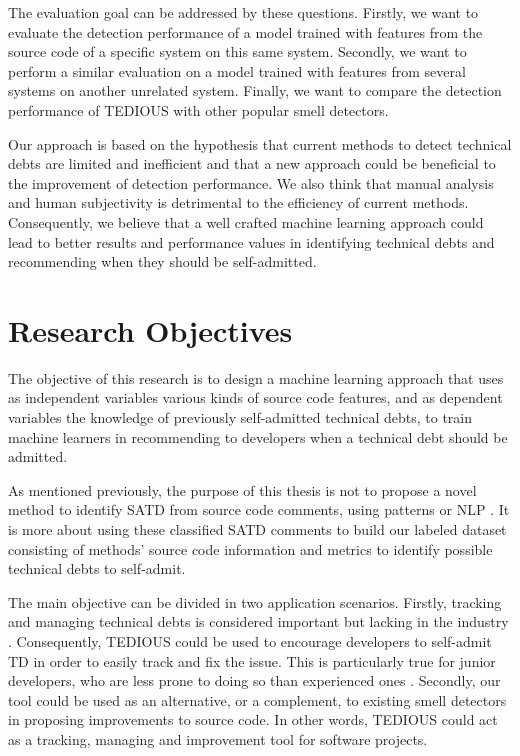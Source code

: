 The evaluation goal can be addressed by these questions. Firstly, we want to evaluate the detection performance of a model trained with features from the source code of a specific system on this same system. Secondly, we want to perform a similar evaluation on a model trained with features from several systems on another unrelated system. Finally, we want to compare the detection performance of TEDIOUS with other popular smell detectors.

Our approach is based on the hypothesis that current methods to detect technical debts are limited and inefficient and that a new approach could be beneficial to the improvement of detection performance. We also think that manual analysis and human subjectivity is detrimental to the efficiency of current methods. Consequently, we believe that a well crafted machine learning approach could lead to better results and performance values in identifying technical debts and recommending when they should be self-admitted. \par

\section{Research Objectives}  


\begin{framed}
	\noindent The objective of this research is to design a machine learning approach that uses as independent variables various kinds of source code features, and as dependent variables the knowledge of previously self-admitted technical debts, to train machine learners in recommending to developers when a technical debt should be admitted.
\end{framed}

As mentioned previously, the purpose of this thesis is not to propose a novel method to identify SATD from source code comments, using patterns or \ac{NLP} \citep{MaldonadoNLP,PotdarS14}. It is more about using these classified SATD comments to build our labeled dataset consisting of methods' source code information and metrics to identify possible technical debts to self-admit. \par
 
The main objective can be divided in two application scenarios. Firstly, tracking and managing technical debts is considered important but lacking in the industry \citep{Ernst:2015:MMI:2786805.2786848}. Consequently, \ac{TEDIOUS} could be used to encourage developers to self-admit \ac{TD} in order to easily track and fix the issue. This is particularly true for junior developers, who are less prone to doing so than experienced ones \citep{PotdarS14}. Secondly, our tool could be used as an alternative, or a complement, to existing smell detectors in proposing improvements to source code. In other words, \ac{TEDIOUS} could act as a tracking, managing and improvement tool for software projects. \par


